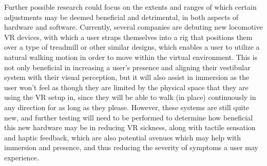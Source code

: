 \documentclass{article}
\begin{document}
Further possible research could focus on the extents and ranges of which certain adjustments may be deemed beneficial and detrimental, in both aspects of hardware and software. Currently, several companies are debuting new locomotive VR devices, with which a user straps themselves into a rig that positions them over a type of treadmill or other similar designs, which enables a user to utilize a natural walking motion in order to move within the virtual environment. This is not only beneficial in increasing a user's presence and aligning their vestibular system with their visual perception, but it will also assist in immersion as the user won't feel as though they are limited by the physical space that they are using the VR setup in, since they will be able to walk (in place) continuously in any direction for as long as they please. However, these systems are still quite new, and further testing will need to be performed to determine how beneficial this new hardware may be in reducing VR sickness, along with tactile sensation and haptic feedback, which are also potential avenues which may help with immersion and presence, and thus reducing the severity of symptoms a user may experience.



\end{document}

